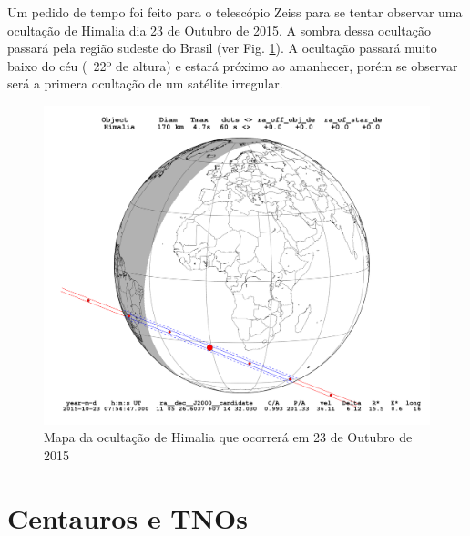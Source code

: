 \documentclass[12pt,a4paper]{monografia}
\begin{document}
Um pedido de tempo foi feito para o telescópio Zeiss para se tentar observar uma ocultação de Himalia  dia 23 de Outubro de 2015. A sombra dessa ocultação passará pela região sudeste do Brasil (ver Fig. \ref{Fig: occ-Himalia-itajuba}). A ocultação passará muito baixo do céu (~22º de altura) e estará próximo ao amanhecer, porém se observar será a primera ocultação de um satélite irregular.

\begin{figure}
\includegraphics[scale=0.35]{figuras/Himalia_2015-10-23T07:54:47.png}
\caption{Mapa da ocultação de Himalia que ocorrerá em 23 de Outubro de 2015}
\label{Fig: occ-Himalia-itajuba}
\end{figure}


\section{Centauros e TNOs}
\label{Sec: TNOs}



\glsaddall
\printglossary




\end{document}
